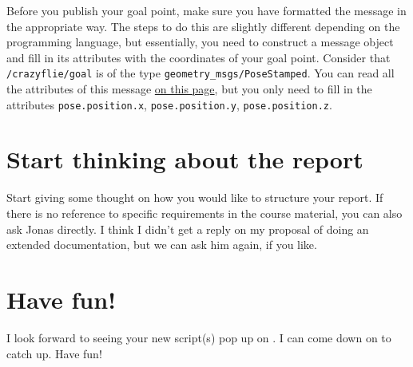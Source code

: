 Before you publish your goal point, make sure you have formatted the message in the appropriate way.
The steps to do this are slightly different depending on the programming language, but essentially, you need to construct a message object and fill in its attributes with the coordinates of your goal point.
Consider that \lstinline|/crazyflie/goal| is of the type \lstinline|geometry_msgs/PoseStamped|.
You can read all the attributes of this message \href{http://docs.ros.org/api/geometry_msgs/html/msg/PoseStamped.html}{on this page}, but you only need to fill in the attributes \lstinline|pose.position.x|, \lstinline|pose.position.y|, \lstinline|pose.position.z|.


\section*{Start thinking about the report}

Start giving some thought on how you would like to structure your report.
If there is no reference to specific requirements in the course material, you can also ask Jonas directly.
I think I didn't get a reply on my proposal of doing an extended documentation, but we can ask him again, if you like.


\section*{Have fun!}

I look forward to seeing your new script(s) pop up on \Github{}.
I can come down on  to catch up.
Have fun!
